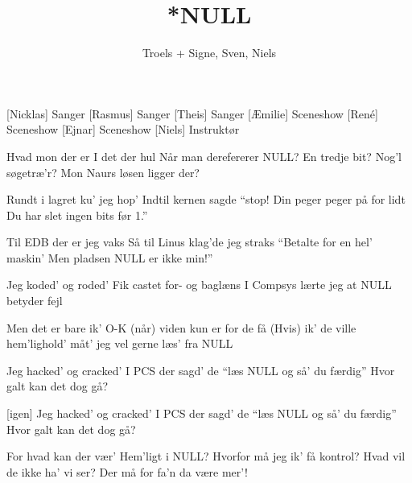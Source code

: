 \documentclass[a4paper,11pt]{article}
\title{*NULL}
\author{Troels + Signe, Sven, Niels}
\begin{document}
\maketitle

\begin{roles}
[Nicklas] Sanger
[Rasmus] Sanger
[Theis] Sanger
[Æmilie] Sceneshow
[René] Sceneshow
[Ejnar] Sceneshow
[Niels] Instruktør
\end{roles}

\begin{song}
%
Hvad mon der er
I det der hul
Når man derefererer NULL?
En tredje bit?
Nog'l søgetræ'r?
Mon Naurs løsen ligger der?


%
Rundt i lagret ku' jeg hop'
Indtil kernen sagde ``stop!
Din peger peger på for lidt
Du har slet ingen bits før 1.''


%
Til EDB der er jeg vaks
Så til Linus klag'de jeg straks
``Betalte for en hel' maskin'
Men pladsen NULL er ikke min!''

%
Jeg koded' og roded'
Fik castet for- og baglæns
I Compsys lærte jeg
at NULL betyder fejl


%
Men det er bare ik' O-K
(når) viden kun er for de få
(Hvis) ik' de ville hem'lighold'
måt' jeg vel gerne læs' fra NULL

%
Jeg hacked' og cracked'
I PCS der sagd' de
``læs NULL og så' du færdig''
Hvor galt kan det dog gå?


[igen]%
Jeg hacked' og cracked'
I PCS der sagd' de
``læs NULL og så' du færdig''
Hvor galt kan det dog gå?

%
For hvad kan der vær'
Hem'ligt i NULL?
Hvorfor må jeg ik' få kontrol?
Hvad vil de ikke ha' vi ser?
Der må for fa'n da være mer'!
\end{song}
\end{document}
